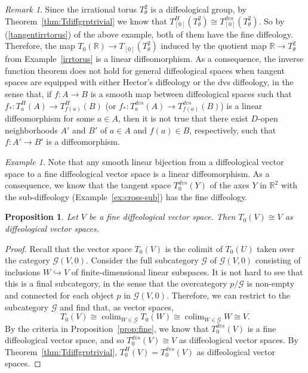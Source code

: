 \documentclass{amsart}
\newtheorem{prop}[de]{Proposition}
\theoremstyle{remark}
\newtheorem{rem}[de]{Remark}
\newtheorem{ex}[de]{Example}
\DeclareMathOperator*{\colim}{colim}
\newcommand{\ra}{\to}
\newcommand{\cG}{{\mathcal{G}}}
\def \R{\mathbb{R}}
\begin{document}
\begin{rem}\label{rem:inverse}
Since the irrational torus $T^2_\theta$ is a diffeological group, by Theorem~\ref{thm:Tdiffgrptrivial}
we know that $T^H_{[0]}(T^2_\theta) \cong T^{dvs}_{[0]}(T^2_\theta)$.
So by (\ref{tangentirrtorus}) of the above example, both of them have the fine diffeology.
Therefore, the map $T_0(\R) \ra T_{[0]}(T^2_\theta)$ induced by the
quotient map $\R \to T^2_\theta$ from Example~\ref{irrtorus} is a linear diffeomorphism.
As a consequence, the inverse function theorem does not hold for general diffeological spaces
when tangent spaces are equipped with either Hector's diffeology or the dvs diffeology,
in the sense that, if $f:A \ra B$ is a smooth map between diffeological spaces such that
$f_*:T_a^H(A) \ra T_{f(a)}^H(B)$ (or $f_*:T_a^{dvs}(A) \ra T_{f(a)}^{dvs}(B)$) is a linear diffeomorphism for some $a \in A$,
then it is not true that there exist $D$-open neighborhoods $A'$ and $B'$ of $a \in A$ and $f(a) \in B$, respectively,
such that $f:A' \ra B'$ is a diffeomorphism.
\end{rem}

\begin{ex}
Note that any smooth linear bijection from a diffeological vector space
to a fine diffeological vector space is a linear diffeomorphism.
As a consequence, we know that the tangent space $T_0^{dvs}(Y)$ of the axes $Y$
in $\R^2$ with the sub-diffeology (Example~\ref{ex:cross-sub}) has the fine diffeology.
\end{ex}

\begin{prop}\label{prop:finedvs}
Let $V$ be a fine diffeological vector space.
Then $T_0(V) \cong V$ as diffeological vector spaces.
\end{prop}

\begin{proof}
Recall that the vector space $T_0(V)$ is the colimit of $T_0(U)$
taken over the category $\cG(V,0)$.
Consider the full subcategory $\cG$ of $\cG(V,0)$
consisting of inclusions $W \hookrightarrow V$ of finite-dimensional linear subspaces.
It is not hard to see that this is a final subcategory, in the sense that
the overcategory $p/\cG$ is non-empty and connected for each
object $p$ in $\cG(V,0)$.
Therefore, we can restrict to the subcategory $\cG$
and find that, as vector spaces,
\[
  T_0(V) \cong \colim_{W \in \cG} T_0(W) \cong \colim_{W \in \cG} W \cong V.
\]
By the criteria in Proposition~\ref{prop:fine}, we know that $T_0^{dvs}(V)$
is a fine diffeological vector space, and so $T_0^{dvs}(V) \cong V$ as
diffeological vector spaces.
By Theorem~\ref{thm:Tdiffgrptrivial},
$T_0^H(V) = T_0^{dvs}(V)$ as diffeological vector spaces.
\end{proof}
\end{document}
